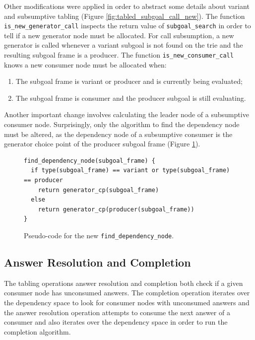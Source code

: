 Other modifications were applied in order to abstract some details about
variant and subsumptive tabling (Figure \ref{fig:tabled_subgoal_call_new}).
The function \texttt{is\_new\_generator\_call} inspects the return value
of \texttt{subgoal\_search} in order to tell if a new generator node must be allocated.
For call subsumption, a new generator is called whenever a variant subgoal is not found
on the trie and the resulting subgoal frame is a producer.
The function \texttt{is\_new\_consumer\_call} knows a new consumer node must be
allocated when:

\begin{enumerate}
  \item The subgoal frame is variant or producer and is currently being evaluated;
  \item The subgoal frame is consumer and the producer subgoal is still evaluating.
\end{enumerate}

Another important change involves calculating the leader node of a subsumptive consumer node.
Surprisingly, only the algorithm to find the dependency node must be altered, as
the dependency node of a subsumptive consumer is the generator choice point of
the producer subgoal frame (Figure \ref{fig:find_dependency_node}).  

\begin{figure}[ht]
\begin{Verbatim}
find_dependency_node(subgoal_frame) {
  if type(subgoal_frame) == variant or type(subgoal_frame) == producer
    return generator_cp(subgoal_frame)
  else
    return generator_cp(producer(subgoal_frame))
}
\end{Verbatim}
\caption{Pseudo-code for the new \texttt{find\_dependency\_node}.}
\label{fig:find_dependency_node}
\end{figure}

\subsection{Answer Resolution and Completion}

The tabling operations answer resolution and completion both check if a
given consumer node has unconsumed answers. The completion operation
iterates over the dependency space to look for consumer nodes with unconsumed
answers and the answer resolution operation attempts to consume the next answer
of a consumer and also iterates over the dependency space in order to run the completion algorithm.

